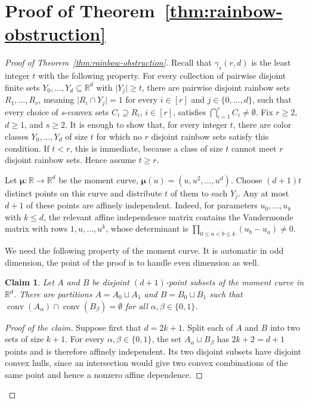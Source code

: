 \documentclass[11pt]{article}
\newtheorem{claim}[theorem]{Claim}
\theoremstyle{definition}
\newenvironment{poc}{\begin{proof}[Proof of the claim]\renewcommand*{\qedsymbol}{\(\blacksquare\)}}{\end{proof}}
\newcommand*{\abs}[1]{\lvert#1\rvert}
\newcommand{\R}{\mathbb{R}}
\begin{document}
\section{Proof of Theorem~\ref{thm:rainbow-obstruction}}
\begin{proof}[Proof of Theorem~\ref{thm:rainbow-obstruction}]
Recall that \(\gamma_{s}(r,d)\) is the least integer \(t\) with the following property. For every collection of pairwise disjoint finite sets \(Y_{0},\ldots,Y_{d}\subseteq\R^{d}\) with \(\abs{Y_{j}}\ge t\), there are pairwise disjoint rainbow sets \(R_{1},\ldots,R_{r}\), meaning \(\abs{R_{i}\cap Y_{j}}=1\) for every \(i\in [r]\) and \(j\in\{0,\ldots,d\}\), such that every choice of \(s\)-convex sets \(C_{i}\supseteq R_{i}\), \(i\in [r]\), satisfies \(\bigcap_{i=1}^{r}C_{i}\ne\emptyset\). Fix \(r\ge2\), \(d\ge1\), and \(s\ge2\). It is enough to show that, for every integer \(t\), there are color classes \(Y_{0},\ldots,Y_{d}\) of size \(t\) for which no \(r\) disjoint rainbow sets satisfy this condition. If \(t<r\), this is immediate, because a class of size \(t\) cannot meet \(r\) disjoint rainbow sets. Hence assume \(t\ge r\).

Let \(\boldsymbol{\mu}:\R\to\R^{d}\) be the moment curve, \(\boldsymbol{\mu}(u)=(u,u^{2},\ldots,u^{d})\). Choose \((d+1)t\) distinct points on this curve and distribute \(t\) of them to each \(Y_{j}\). Any at most \(d+1\) of these points are affinely independent. Indeed, for parameters \(u_{0},\ldots,u_{k}\) with \(k\le d\), the relevant affine independence matrix contains the Vandermonde matrix with rows \(1,u,\ldots,u^{k}\), whose determinant is \(\prod_{0\le a<b\le k}(u_{b}-u_{a})\ne0\).

We need the following property of the moment curve. It is automatic in odd dimension, the point of the proof is to handle even dimension as well.

\begin{claim}\label{claim:two-piece-moment}
Let \(A\) and \(B\) be disjoint \((d+1)\)-point subsets of the moment curve in \(\R^{d}\). There are partitions \(A=A_{0}\sqcup A_{1}\) and \(B=B_{0}\sqcup B_{1}\) such that \(\operatorname{conv}(A_{\alpha})\cap\operatorname{conv}(B_{\beta})=\emptyset\) for all \(\alpha,\beta\in\{0,1\}\).
\end{claim}

\begin{poc}
Suppose first that \(d=2k+1\). Split each of \(A\) and \(B\) into two sets of size \(k+1\). For every \(\alpha,\beta\in\{0,1\}\), the set \(A_{\alpha}\sqcup B_{\beta}\) has \(2k+2=d+1\) points and is therefore affinely independent. Its two disjoint subsets have disjoint convex hulls, since an intersection would give two convex combinations of the same point and hence a nonzero affine dependence.


\end{poc}
\end{proof}
\end{document}

